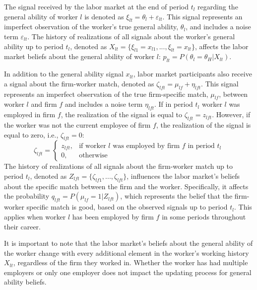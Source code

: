 \documentclass[12pt]{article}
\begin{document}
\begin{enumerate}[label={A}{\arabic*}.]
    The signal received by the labor market at the end of period $t_l$ regarding the general ability of worker $l$ is denoted as $\xi_{lt} = \theta_l + \varepsilon_{lt}$. This signal represents an imperfect observation of the worker's true general ability, $\theta_l$, and includes a noise term $\varepsilon_{lt}$. The history of realizations of all signals about the worker's general ability up to period $t_l$, denoted as $X_{lt} = \lbrace\xi_{l1}= x_{l1}, ..., \xi_{lt} = x_{lt}\rbrace$, affects the labor market beliefs about the general ability of worker $l$: $p_{lt} = P(\theta_l = \theta_H | X_{lt})$.

    In addition to the general ability signal $x_{lt}$, labor market participants also receive a signal about the firm-worker match, denoted as $\zeta_{lft} = \mu_{lf} + \eta_{lft}$. This signal represents an imperfect observation of the true firm-specific match, $\mu_{lf}$, between worker $l$ and firm $f$ and includes a noise term $\eta_{lft}$. If in period $t_l$ worker $l$ was employed in firm $f$, the realization of the signal is equal to $\zeta_{lft} = z_{lft}$. However, if the worker was not the current employee of firm $f$, the realization of the signal is equal to zero, i.e., $\zeta_{lft} = 0$:
    \begin{equation}\label{eq:zeta}
        \zeta_{lft} =
        \begin{cases}
            z_{lft}, & \text{if worker $l$ was employed by firm $f$ in period $t_l$} \\
            0, & \text{otherwise}
        \end{cases}
    \end{equation}
    The history of realizations of all signals about the firm-worker match up to period $t_l$, denoted as $Z_{lft} = \lbrace\zeta_{lf1}, ... ,\zeta_{lft}\rbrace$, influences the labor market's beliefs about the specific match between the firm and the worker. Specifically, it affects the probability $q_{lft} = P(\mu_{lf} = 1 | Z_{lft})$, which represents the belief that the firm-worker specific match is good, based on the observed signals up to period $t_l$. This applies when worker $l$ has been employed by firm $f$ in some periods throughout their career.
\end{enumerate}	 

It is important to note that the labor market's beliefs about the general ability of the worker change with every additional element in the worker's working history $X_{lt}$, regardless of the firm they worked in. Whether the worker has had multiple employers or only one employer does not impact the updating process for general ability beliefs.
\end{document}
